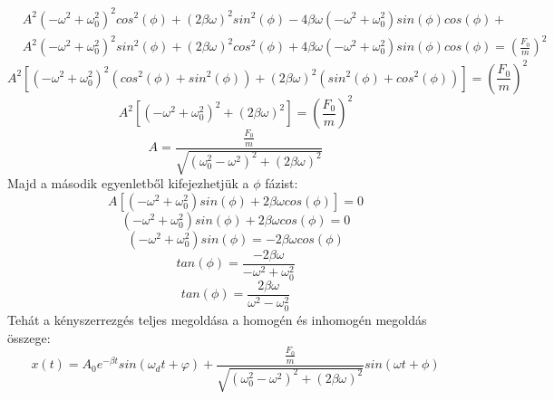 \documentclass[../main.tex]{subfiles}
\begin{document}
\begin{equation}
    \begin{aligned}
        & A^2 \left(-\omega^2 + \omega^2_0\right)^2 cos^2(\phi) + \left(2\beta \omega\right)^2 sin^2(\phi) - 4\beta \omega \left(-\omega^2 + \omega^2_0\right) sin(\phi) cos(\phi) + \\
        & A^2 \left(-\omega^2 + \omega^2_0\right)^2 sin^2(\phi) + \left(2\beta \omega\right)^2 cos^2(\phi) + 4\beta \omega \left(-\omega^2 + \omega^2_0\right) sin(\phi) cos(\phi) = \left(\frac{F_0}{m}\right)^2
    \end{aligned}
\end{equation}
\begin{equation}
    A^2 \left[ \left(-\omega^2 + \omega^2_0\right)^2 \left( cos^2(\phi) + sin^2(\phi) \right) + \left(2\beta \omega\right)^2 \left( sin^2(\phi) + cos^2(\phi) \right) \right] = \left(\frac{F_0}{m}\right)^2
\end{equation}
\begin{equation}
    A^2 \left[ \left(-\omega^2 + \omega^2_0\right)^2 + \left(2\beta \omega\right)^2 \right] = \left(\frac{F_0}{m}\right)^2
\end{equation}
\begin{equation}
    A = \frac{\frac{F_0}{m}}{\sqrt{(\omega_0^2 - \omega^2)^2 + (2\beta \omega)^2}}
\end{equation}
Majd a második egyenletből kifejezhetjük a $\phi$ fázist:
\begin{equation}
    A\left[\left( - \omega^2 + \omega_0^2  \right) sin(\phi) + 2\beta  \omega cos(\phi)\right] = 0
\end{equation}
\begin{equation}
    \left( - \omega^2 + \omega_0^2  \right) sin(\phi) + 2\beta  \omega cos(\phi) = 0
\end{equation}
\begin{equation}
    \left( - \omega^2 + \omega_0^2  \right) sin(\phi) = - 2\beta  \omega cos(\phi)
\end{equation}
\begin{equation}
    tan(\phi) = \frac{- 2\beta  \omega}{- \omega^2 + \omega_0^2}
\end{equation}
\begin{equation}
    tan(\phi) = \frac{2\beta  \omega}{\omega^2 - \omega_0^2}
\end{equation}
Tehát a kényszerrezgés teljes megoldása a homogén és inhomogén megoldás összege:
\begin{equation}
    x(t) = A_0 e^{-\beta t} sin(\omega_d t + \varphi) + \frac{\frac{F_0}{m}}{\sqrt{(\omega_0^2 - \omega^2)^2 + (2\beta \omega)^2}} sin(\omega t + \phi)
\end{equation}
\end{document}
